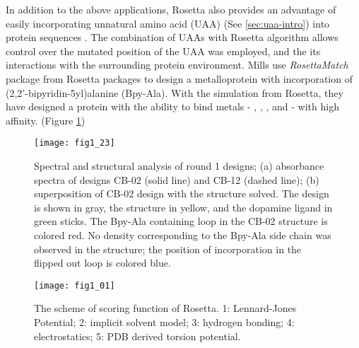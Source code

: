 \begin{refsection}
In addition to the above applications, Rosetta also provides an
advantage of easily incorporating unnatural amino acid (UAA) (See
\ref{sec:uaa-intro}) into protein sequences \cite{Renfrew2012b}. The
combination of UAAs with Rosetta algorithm allows control over the mutated
position of the UAA was employed, and the its interactions with the surrounding
protein environment\cite{Renfrew2012b}. Mills  use
\emph{RosettaMatch} package from Rosetta packages to design a metalloprotein
with incorporation of (2,2’-bipyridin-5yl)alanine (Bpy-Ala)\cite{Mills2013}.
With the simulation from Rosetta, they have designed a protein with the ability to
bind metals - , , , and  - with
high affinity. (Figure \ref{fig:rosetta-uaa})
\begin{figure}[p] \centering \texttt{[image: fig1\_23]}
    \caption[Spectral and structural analysis of round 1 designs; (a)
        absorbance spectra of designs CB-02 (solid line) and CB-12 (dashed
        line); (b) superposition of CB-02 design with the structure solved. The
        design is shown in gray, the structure in yellow, and the dopamine
        ligand in green sticks. The Bpy-Ala containing loop in the CB-02
        structure is colored red. No density corresponding to the Bpy-Ala side
        chain was observed in the structure; the position of incorporation in
    the flipped out loop is colored blue.] {Spectral and structural analysis of
        round 1 designs; (a) absorbance spectra of designs CB-02 (solid line)
        and CB-12 (dashed line); (b) superposition of CB-02 design with the
        structure solved. The design is shown in gray, the structure in yellow,
        and the dopamine ligand in green sticks. The Bpy-Ala containing loop in
        the CB-02 structure is colored red. No density corresponding to the
        Bpy-Ala side chain was observed in the structure; the position of
        incorporation in the flipped out loop is colored blue\cite{Mills2013}.}
        \label{fig:rosetta-uaa} 
\end{figure}
\begin{figure}[htbp] \centering \texttt{[image: fig1\_01]}
    \caption[The scheme of scoring function of Rosetta. 1: Lennard-Jones
    Potential; 2: implicit solvent model; 3: hydrogen bonding; 4:
electrostatics; 5: PDB drived torsion potential.]{The scheme of scoring
    function of Rosetta. 1: Lennard-Jones Potential; 2: implicit solvent model;
3: hydrogen bonding; 4: electrostatics; 5: PDB derived torsion potential.}
\label{fig:rosetta-intro}
\end{figure}


\end{refsection}
